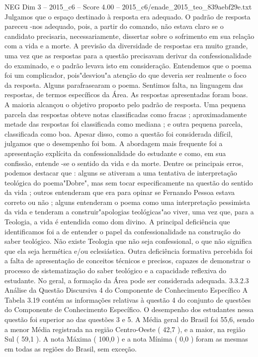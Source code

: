 \begin{textsample}{NEG Dim 3 – 2015\_c6 – Score 4.00 – 2015\_c6/enade\_2015\_teo\_839aebf29e.txt}
Julgamos que o espaço destinado à resposta era adequado.
O padrão de resposta pareceu -nos adequado, pois, a partir do comando, não estava claro se o candidato precisaria, necessariamente, dissertar sobre o sofrimento em sua relação com a vida e a morte.
A previsão da diversidade de respostas era muito grande, uma vez que as respostas para a questão precisavam derivar da confessionalidade do examinado, e o padrão levava isto em consideração.
Entendemos que o poema foi um complicador, pois"desviou"a atenção do que deveria ser realmente o foco da resposta.
Alguns parafrasearam o poema.
Sentimos falta, na linguagem das respostas, de termos específicos da Área.
As respostas apresentadas foram boas.
A maioria alcançou o objetivo proposto pelo padrão de resposta.
Uma pequena parcela das respostas obteve notas classificadas como fracas ; aproximadamente metade das respostas foi classificada como mediana ; e outra pequena parcela, classificada como boa.
Apesar disso, como a questão foi considerada difícil, julgamos que o desempenho foi bom.
A abordagem mais frequente foi a apresentação explícita da confessionalidade do estudante e como, em sua confissão, entende -se o sentido da vida e da morte.
Dentre os principais erros, podemos destacar que : alguns se ativeram a uma tentativa de interpretação teológica do poema"Dobre", mas sem tocar especificamente na questão do sentido da vida ; outros entenderam que era para opinar se Fernando Pessoa estava correto ou não ; alguns entenderam o poema como uma interpretação pessimista da vida e tenderam a construir"apologias teológicas"ao viver, uma vez que, para a Teologia, a vida é entendida como dom divino.
A principal deficiência que identificamos foi a de entender o papel da confessionalidade na construção do saber teológico.
Não existe Teologia que não seja confessional, o que não significa que ela seja hermética e/ou eclesiástica.
Outra deficiência formativa percebida foi a falta de apresentação de conceitos técnicos e precisos, capazes de demonstrar o processo de sistematização do saber teológico e a capacidade reflexiva do estudante.
No geral, a formação da Área pode ser considerada adequada. 3.3.2.3 Análise da Questão Discursiva 4 do Componente de Conhecimento Específico A Tabela 3.19 contém as informações relativas à questão 4 do conjunto de questões do Componente de Conhecimento Específico.
O desempenho dos estudantes nessa questão foi superior ao das questões 3 e 5.
A Média geral do Brasil foi 55,6, sendo a menor Média registrada na região Centro-Oeste ( 42,7 ), e a maior, na região Sul ( 59,1 ).
A nota Máxima ( 100,0 ) e a nota Mínima ( 0,0 ) foram as mesmas em todas as regiões do Brasil, sem exceção.

\end{textsample}
